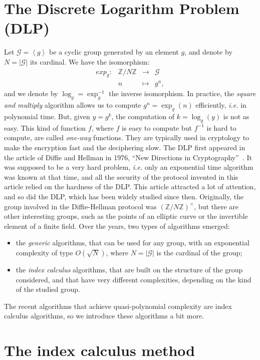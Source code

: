\documentclass[a4paper,11pt]{article}
\theoremstyle{break}
\theoremstyle{sc}
\theoremstyle{definition}
\theoremstyle{remark}
\newcommand{\ie}{\emph{i.e. }}
\begin{document}
\section{The Discrete Logarithm Problem (DLP)}
Let $\mathcal G=\left\langle g\right\rangle$ be a cyclic group generated by an element
$g$, and denote by $N=|\mathcal G|$ its cardinal. We have the isomorphism:
\[
 \begin{array}{cccc}
   exp_g: & \mathbb{Z}/N\mathbb{Z} & \to & \mathcal G \\
   & n & \mapsto & g^n,
 \end{array}
\]
and we denote by $\log_g=\exp_g^{-1}$ the inverse isomorphism. In practice, the
\emph{square and multiply} algorithm allows us to compute $g^n=\exp_g(n)$
efficiently, \ie in polynomial time. But, given $y = g^k$, the computation of $k
= \log_g(y)$ is not as easy. This kind of function $f$, where $f$ is easy to
compute but $f^{-1}$ is hard to compute, are called \emph{one-way} functions. They are
typically used in cryptology to make the encryption fast and the deciphering
slow. The DLP first appeared in the article of Diffie and
Hellman in 1976, ``New Directions in Cryptography''~\cite{DH76}. It was supposed to be a very hard problem,
\ie only an exponential time algorithm was known at that time, and all the
security of the protocol invented in this article relied on the hardness of the
DLP. This article attracted a lot of attention, and so did the DLP, which has
been widely studied since then. Originally, the group involved in the Diffie-Hellman
protocol was $(\mathbb{Z}/N\mathbb{Z})^\times$, but there are other interesting
groups, such as the points of an elliptic curve or the invertible element of a
finite field. Over the years, two types of algorithms emerged:
\begin{itemize}
  \item the \emph{generic} algorithms, that can be used for any group, with an
    exponential complexity of type $O(\sqrt N)$, where $N=|\mathcal G|$ is the cardinal
    of the group;
  \item the \emph{index calculus} algorithms, that are built on the structure of
    the group considered, and that have very different complexities, depending
    on the kind of the studied group.
\end{itemize}

The recent algorithms that achieve quasi-polynomial complexity are index
calculus algorithms, so we introduce these algorithms a bit more.

\section{The index calculus method}
\end{document}
